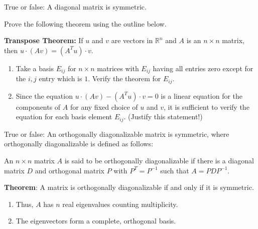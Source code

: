 \documentclass[12pt,letterpaper]{article}
\begin{document}
\begin{enumerate}

\Problem True or false: A diagonal matrix is symmetric.
\vspace{1in}



\Problem
Prove the following theorem using the outline below.

\textbf{Transpose Theorem:}
If $u$ and $v$ are vectors in $\mathbb{R}^n$ and $A$ is an $n \times n$ matrix, then $u \cdot (Av) = (A^Tu) \cdot v.$

\begin{enumerate}
    \item[a)] Take a basis $E_{ij}$ for $n \times n$ matrices with $E_{ij}$ having all entries zero except for the $i,j$ entry which is $1.$ Verify the theorem for $E_{ij}.$\vfill
    \item[b)] Since the equation $u \cdot (Av) - (A^Tu) \cdot v = 0$ is a linear equation for the components of $A$ for any fixed choice of $u$ and $v$, it is sufficient to verify the equation for each basis element $E_{ij}.$ (Justify this statement!)\vfill
\end{enumerate}

\newpage


\Problem True or false: An orthogonally diagonalizable matrix is symmetric, where orthogonally diagonalizable is defined as follows:

\begin{defn}
An $n \times n$ matrix $A$ is said to be orthogonally diagonalizable if there is a diagonal matrix $D$ and orthogonal matrix $P$ with $P^T = P^{-1}$ such that $A = PDP^{-1}.$
\end{defn}


\vfill


\textbf{Theorem}:
A matrix is orthogonally diagonalizable if and only if it is symmetric.
\begin{enumerate}
    \item[a)] Thus, $A$ has $n$ real eigenvalues counting multiplicity.
    \item[b)] The eigenvectors form a complete, orthogonal basis.
\end{enumerate}
\vfill



\end{enumerate}
\end{document}
